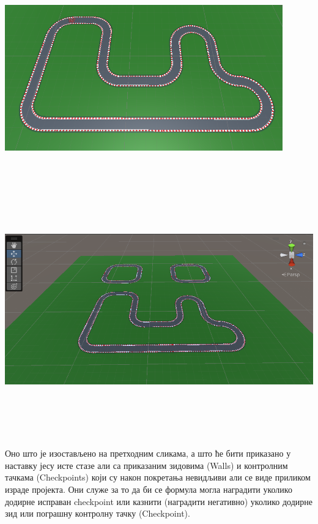 \documentclass[12pt]{article}
\begin{document}
\begin{center}
    \centering 
    \includegraphics[height=8cm, width=12cm]{images/track3}
\end{center}
\vspace{0.5cm}
    \begin{center}
    \centering 
    \includegraphics[height=11cm, width=15cm]{images/allTracks}
\end{center}
\vspace{0.7cm}
Оно што је изостављено на претходним сликама, а што ће бити приказано у наставку јесу исте стазе али са приказаним зидовима (Walls) и контролним тачкама (Checkpoints) који су након покретања невидљиви али се виде приликом израде пројекта. Они служе за то да би се формула могла наградити уколико додирне исправан checkpoint или казнити (наградити негативно) уколико додирне зид или пограшну контролну тачку (Checkpoint). 
\end{document}
